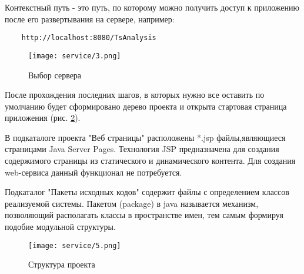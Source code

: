 Контекстный путь - это путь, по которому можно получить доступ к приложению после его развертывания на сервере, например:
\begin{verbatim}
	http://localhost:8080/TsAnalysis
\end{verbatim}

\begin{figure}[h!]
\center
	\texttt{[image: service/3.png]}
	\caption{Выбор сервера}
	\label{pict:projectserv}
\end{figure}

После прохождения последних шагов, в которых нужно все оставить по умолчанию будет сформировано дерево проекта и открыта стартовая страница приложения (рис. \ref{pict:projecttree}). 

В подкаталоге проекта "Веб страницы" расположены *.jsp файлы,являющиеся страницами Java Server Pages. Технология JSP предназначена для создания содержимого страницы из статического и динамического контента. Для создания web-сервиса данный функционал не потребуется.

Подкаталог "Пакеты исходных кодов" содержит файлы с определением классов реализуемой системы. Пакетом (package) в java называется механизм, позволяющий располагать классы в пространстве имен, тем самым формируя подобие модульной структуры.

\begin{figure}[h!]
\center
	\texttt{[image: service/5.png]}
	\caption{Структура проекта}
	\label{pict:projecttree}
\end{figure}



